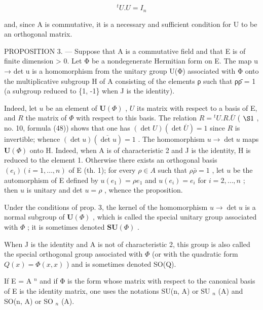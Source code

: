 \[
{ } ^ { t } U . U = I _ { n }\tag{5}
\]

and, since A is commutative, it is a necessary and sufficient condition for U to be an orthogonal matrix.

PROPOSITION 3. --- Suppose that A is a commutative field and that E is of finite dimension \textgreater{} 0. Let Φ be a nondegenerate Hermitian form on E. The map u → det u is a homomorphism from the unitary group U(Φ) associated with Φ onto the multiplicative subgroup H of A consisting of the elements ρ such that ρρ̄ = 1 (a subgroup reduced to \{1, -1\} when J is the identity).

Indeed, let \(u\) be an element of \(\mathbf{U}(\Phi)\) , \(U\) its matrix with respect to a basis of E, and \(R\) the matrix of \(\Phi\) with respect to this basis. The relation \(R = {}^t U.R.\overline{U}\) ( \(\S 1\) , no. 10, formula (48)) shows that one has \((\det U)(\det \overline{U}) = 1\) since \(R\) is invertible; whence \((\det u)(\overline{\det u}) = 1\) . The homomorphism \(u \to \det u\) maps \(\mathbf{U}(\Phi)\) onto H. Indeed, when A is of characteristic 2 and J is the identity, H is reduced to the element 1. Otherwise there exists an orthogonal basis \((e_i)(i = 1,\ldots,n)\) of E (th. 1); for every \(\rho \in A\) such that \(\rho \bar{\rho} = 1\) , let \(u\) be the automorphism of E defined by \(u(e_1) = \rho e_1\) and \(u(e_i) = e_i\) for \(i = 2,\ldots,n\) ; then \(u\) is unitary and det \(u = \rho\) , whence the proposition.

Under the conditions of prop. 3, the kernel of the homomorphism \(u \to \det u\) is a normal subgroup of \(\mathbf{U}(\Phi)\) , which is called the special unitary group associated with \(\Phi\) ; it is sometimes denoted \(\mathbf{SU}(\Phi)\) .

When J is the identity and A is not of characteristic 2, this group is also called the special orthogonal group associated with \(\Phi\) (or with the quadratic form \(Q(x) = \Phi(x, x)\) ) and is sometimes denoted SO(Q).

If E = A \(^{n}\) and if Φ is the form whose matrix with respect to the canonical basis of E is the identity matrix, one uses the notations SU(n, A) or SU \(_{n}\) (A) and SO(n, A) or SO \(_{n}\) (A).

